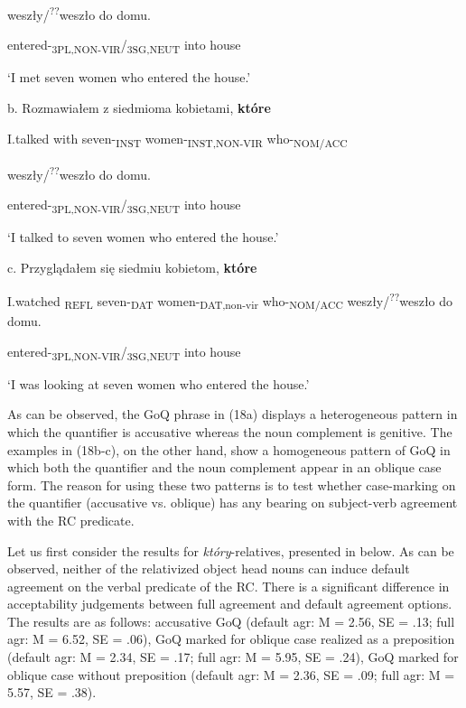 \documentclass[output=paper]{langsci/langscibook}
\begin{document}
    weszły/\textsuperscript{??}weszło   do   domu. 

    entered-\textsubscript{3PL,NON-VIR}/\textsubscript{3SG,NEUT}   into  house  

 ‘I met seven women who entered the house.’

  b.   Rozmawiałem   z   siedmioma  kobietami,  \textbf{które} 

    I.talked   with   seven-\textsubscript{INST}   women-\textsubscript{INST,NON-VIR}  who-\textsubscript{NOM/ACC}     

    weszły/\textsuperscript{??}weszło   do   domu.

    entered-\textsubscript{3PL,NON-VIR}/\textsubscript{3SG,NEUT} into   house

 ‘I talked to seven women who entered the house.’

  c.   Przyglądałem się   siedmiu   kobietom,    \textbf{które} 

    I.watched    \textsubscript{REFL}   seven-\textsubscript{DAT}   women-\textsubscript{DAT,non-vir}   who-\textsubscript{NOM/ACC}         weszły/\textsuperscript{??}weszło       do   domu.

    entered-\textsubscript{3PL,NON-VIR}/\textsubscript{3SG,NEUT}   into house 

    ‘I was looking at seven women who entered the house.’

\begin{styleListParagraph}
As can be observed, the GoQ phrase in (18a) displays a heterogeneous pattern in which the quantifier is accusative whereas the noun complement is genitive. The examples in (18b-c), on the other hand, show a homogeneous pattern of GoQ in which both the quantifier and the noun complement appear in an oblique case form. The reason for using these two patterns is to test whether case-marking on the quantifier (accusative vs. oblique) has any bearing on subject-verb agreement with the RC predicate.
\end{styleListParagraph}

\begin{styleListParagraph}
Let us first consider the results for \textit{który}{}-relatives, presented in \textbf{} below. As can be observed, neither of the relativized object head nouns can induce default agreement on the verbal predicate of the RC. There is a significant difference in acceptability judgements between full agreement and default agreement options. The results are as follows: accusative GoQ (default agr: M = 2.56, SE = .13; full agr: M = 6.52, SE = .06), GoQ marked for oblique case realized as a preposition (default agr: M = 2.34, SE = .17; full agr: M = 5.95, SE = .24), GoQ marked for oblique case without preposition (default agr: M = 2.36, SE = .09; full agr: M = 5.57, SE = .38).
\end{styleListParagraph}
\end{document}
